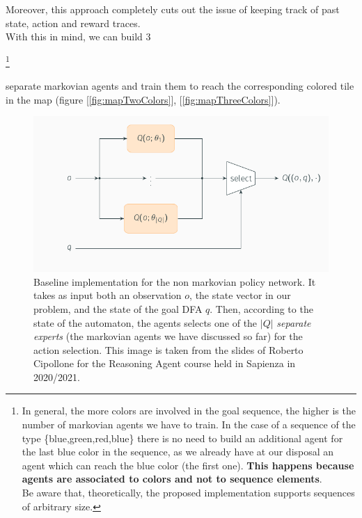 \documentclass{article}
\begin{document}
Moreover, this approach completely cuts out the issue of keeping track of past state, action and reward traces.\\
With this in mind, we can build 3

\footnote{In general, the more colors are involved in the goal sequence, the higher is the number of markovian agents we have to train. In the case of a sequence of the type \{\color{blue}blue\color{black},\color{green}green\color{black},\color{red}red\color{red},\color{blue}blue\color{black}\} there is no need to build an additional agent for the last blue color in the sequence, as we already have at our disposal an agent which can reach the blue color (the first one). \textbf{This happens because agents are associated to colors and not to sequence elements}. \\
Be aware that, theoretically, the proposed implementation supports sequences of arbitrary size.} 

separate markovian agents and train them to reach the corresponding colored tile in the map (figure [\ref{fig:mapTwoColors}], [\ref{fig:mapThreeColors}]). \\


\begin{figure}
    \centering
    \includegraphics[width=\textwidth]{images/baseline_implementation_schema.png}
    \caption{Baseline implementation for the non markovian policy network. It takes as input both an observation \(o\), the state vector in our problem, and the state of the goal DFA \(q\). Then, according to the state of the automaton, the agents selects one of the \(|Q|\) \textit{separate experts} (the markovian agents we have discussed so far) for the action selection. This image is taken from the slides of Roberto Cipollone for the Reasoning Agent course held in Sapienza in 2020/2021.}
    \label{fig:baselineSchema}
\end{figure}
\end{document}
